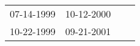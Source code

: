 \begin{supertabular}{llll}
 07-14-1999 &  10-12-2000 \\
 10-22-1999 &  09-21-2001 \\
\end{supertabular}
